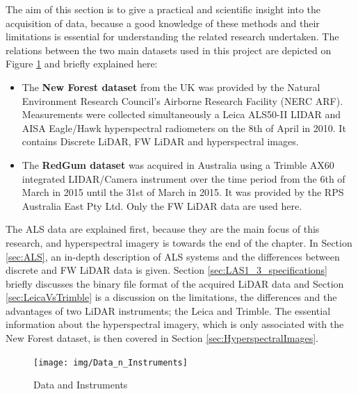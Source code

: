 \documentclass{subfiles}
\begin{document}
The aim of this section is to give a practical and scientific insight into the acquisition of data, because a good knowledge of these methods and their limitations is essential for understanding the related research undertaken. The relations between the two main datasets used in this project are depicted on Figure \ref{fig:dataInstrumentsRelations} and briefly explained here: 
\begin{itemize}
\item The \textbf{New Forest dataset} from the UK was provided by the Natural Environment Research Council’s Airborne Research Facility (NERC ARF).  Measurements were collected simultaneously a Leica ALS50-II LIDAR and AISA Eagle/Hawk hyperspectral radiometers on the 8th of April in 2010.  It contains Discrete LiDAR, FW LiDAR and hyperspectral images. 
\item The \textbf{RedGum dataset} was acquired in Australia using a Trimble AX60 integrated LIDAR/Camera instrument over the time period from the 6th of March in 2015 until the 31st of March in 2015.  It was provided by the RPS Australia East Pty Ltd.  Only the FW LiDAR data are used here. 
\end{itemize}

The ALS data are explained first, because they are the main focus of this research, and hyperspectral imagery is towards the end of the chapter. In Section \ref{sec:ALS}, an in-depth description of ALS systems and the differences between discrete and FW LiDAR data is given.  Section \ref{sec:LAS1_3_specifications} briefly discusses the binary file format of the acquired LiDAR data and Section \ref{sec:LeicaVsTrimble} is a discussion on the limitations, the differences and the advantages of two LiDAR instruments; the Leica and Trimble. The essential information about the hyperspectral imagery, which is only associated with the New Forest dataset, is then covered in Section \ref{sec:HyperspectralImages}. 


\begin{figure}[!htbp]
	\centering
	\texttt{[image: img/Data\_n\_Instruments]}
	\caption{Data and Instruments}
   	\label{fig:dataInstrumentsRelations}
\end{figure}
\end{document}
